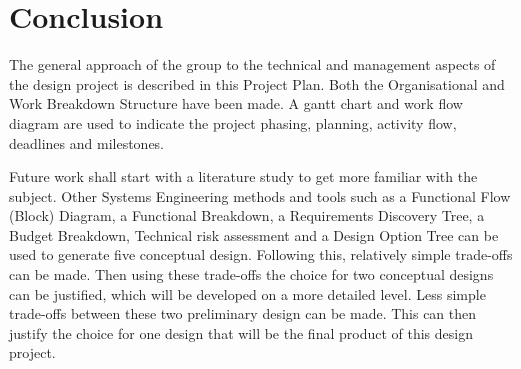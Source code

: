 \section{Conclusion}\label{cha:conclusion}
The general approach of the group to the technical and management aspects of the design project is described in this Project Plan. Both the Organisational and Work Breakdown Structure have been made. A gantt chart and work flow diagram are used to indicate the project phasing, planning, activity flow, deadlines and milestones.

Future work shall start with a literature study to get more familiar with the subject. Other Systems Engineering methods and tools such as a Functional Flow (Block) Diagram, a Functional Breakdown, a Requirements Discovery Tree, a Budget Breakdown, Technical risk assessment and a Design Option Tree can be used to generate five conceptual design. Following this, relatively simple trade-offs can be made. Then using these trade-offs the choice for two conceptual designs can be justified, which will be developed on a more detailed level. Less simple trade-offs between these two preliminary design can be made. This can then justify the choice for one design that will be the final product of this design project.